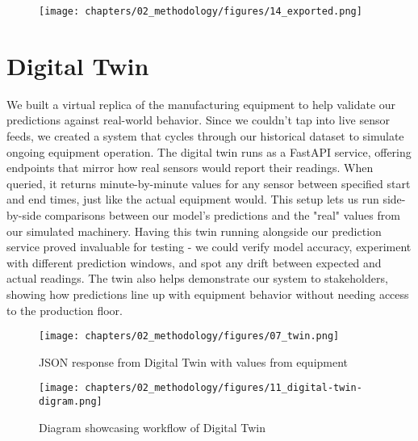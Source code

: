 \begin{figure}[H]
    \centering
    \texttt{[image: chapters/02\_methodology/figures/14\_exported.png]}
    \caption{}
    \label{fig:Diagram representing artifacts of model training}
\end{figure}

\section{Digital Twin}
We built a virtual replica of the manufacturing equipment to help validate our predictions against real-world behavior. Since we couldn't tap into live sensor feeds, we created a system that cycles through our historical dataset to simulate ongoing equipment operation. The digital twin runs as a FastAPI service, offering endpoints that mirror how real sensors would report their readings. When queried, it returns minute-by-minute values for any sensor between specified start and end times, just like the actual equipment would. This setup lets us run side-by-side comparisons between our model's predictions and the "real" values from our simulated machinery. Having this twin running alongside our prediction service proved invaluable for testing - we could verify model accuracy, experiment with different prediction windows, and spot any drift between expected and actual readings. The twin also helps demonstrate our system to stakeholders, showing how predictions line up with equipment behavior without needing access to the production floor.

\begin{figure}[H]
    \centering
    \texttt{[image: chapters/02\_methodology/figures/07\_twin.png]}
    \caption{JSON response from Digital Twin with values from equipment}
\end{figure}

\begin{figure}
    \centering
    \texttt{[image: chapters/02\_methodology/figures/11\_digital-twin-digram.png]}
    \caption{Diagram showcasing workflow of Digital Twin}
    \label{fig:digital-twin-workflow}
\end{figure}

